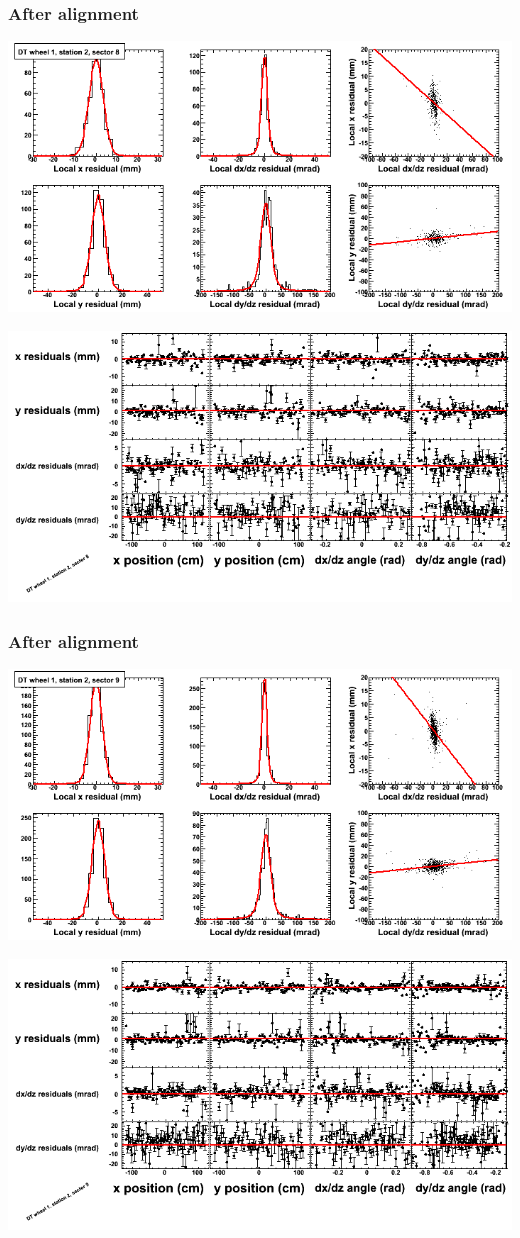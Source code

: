 \documentclass[compress]{beamer}
\begin{document}
\begin{frame}
\frametitle{After alignment}
\includegraphics[width=0.7\linewidth]{NOV4_fitfunctions/MBwhDst2sec08_bellcurves.png}

\includegraphics[width=0.7\linewidth]{NOV4_fitfunctions/MBwhDst2sec08_polynomials.png}
\end{frame}

\begin{frame}
\frametitle{After alignment}
\includegraphics[width=0.7\linewidth]{NOV4_fitfunctions/MBwhDst2sec09_bellcurves.png}

\includegraphics[width=0.7\linewidth]{NOV4_fitfunctions/MBwhDst2sec09_polynomials.png}
\end{frame}
\end{document}

